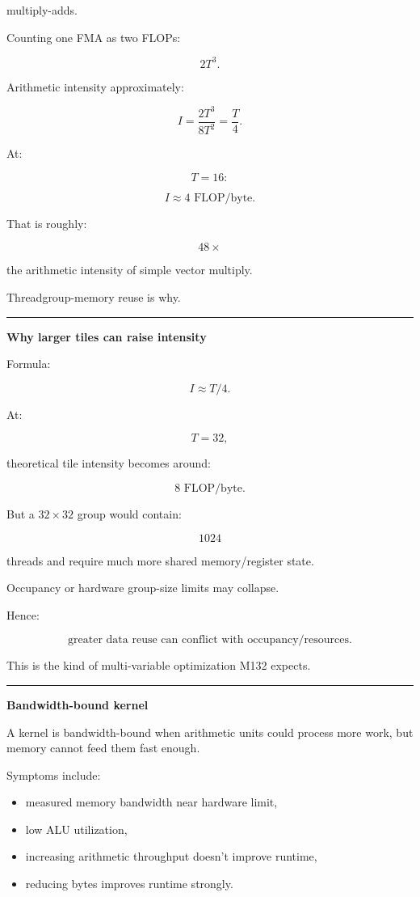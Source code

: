 multiply-adds.

Counting one FMA as two FLOPs:

\[
2T^3.
\]

Arithmetic intensity approximately:

\[
\boxed{
I=
\frac{
2T^3
}{
8T^2
}
=
\frac T4.
}
\]

At:

\[
T=16:
\]

\[
\boxed{
I\approx4\text{ FLOP/byte}.
}
\]

That is roughly:

\[
48\times
\]

the arithmetic intensity of simple vector multiply.

Threadgroup-memory reuse is why.

\begin{center}\rule{0.5\linewidth}{0.5pt}\end{center}

\textbf{Why larger tiles can raise intensity}

Formula:

\[
I\approx T/4.
\]

At:

\[
T=32,
\]

theoretical tile intensity becomes around:

\[
8\text{ FLOP/byte}.
\]

But a \(32\times32\) group would contain:

\[
1024
\]

threads and require much more shared memory/register state.

Occupancy or hardware group-size limits may collapse.

Hence:

\[
\boxed{
\text{greater data reuse can conflict with occupancy/resources}.
}
\]

This is the kind of multi-variable optimization M132 expects.

\begin{center}\rule{0.5\linewidth}{0.5pt}\end{center}

\textbf{Bandwidth-bound kernel}

A kernel is bandwidth-bound when arithmetic units could process more work, but memory cannot feed them fast enough.

Symptoms include:

\begin{itemize}
\tightlist
\item
  measured memory bandwidth near hardware limit,
\item
  low ALU utilization,
\item
  increasing arithmetic throughput doesn't improve runtime,
\item
  reducing bytes improves runtime strongly.
\end{itemize}

